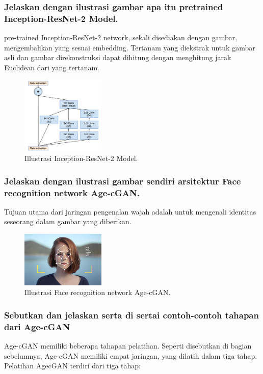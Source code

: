 \subsubsection{Jelaskan dengan ilustrasi gambar apa itu pretrained Inception-ResNet-2 Model.}
\hfill \break
pre-trained Inception-ResNet-2 network, sekali disediakan dengan gambar, mengembalikan yang sesuai embedding. Tertanam yang diekstrak untuk gambar asli dan gambar direkonstruksi dapat dihitung dengan menghitung jarak Euclidean dari yang tertanam.
	\begin{figure}[H]
		\includegraphics[width=4cm]{figures/1174057/chapter9/6.png}
		\centering
		\caption{Illustrasi Inception-ResNet-2 Model.}
	\end{figure}
	
\subsubsection{Jelaskan dengan ilustrasi gambar sendiri arsitektur Face recognition network Age-cGAN.}
\hfill \break
Tujuan utama dari jaringan pengenalan wajah adalah untuk mengenali identitas seseorang dalam gambar yang diberikan.
\begin{figure}[H]
		\includegraphics[width=4cm]{figures/1174057/chapter9/7.jpg}
		\centering
		\caption{Illustrasi Face recognition network Age-cGAN.} 
\end{figure}

\subsubsection{Sebutkan dan jelaskan serta di sertai contoh-contoh tahapan dari Age-cGAN}
\hfill \break
Age-cGAN memiliki beberapa tahapan pelatihan. Seperti disebutkan di bagian sebelumnya, Age-cGAN memiliki empat jaringan, yang dilatih dalam tiga tahap. Pelatihan AgecGAN terdiri dari tiga tahap:

